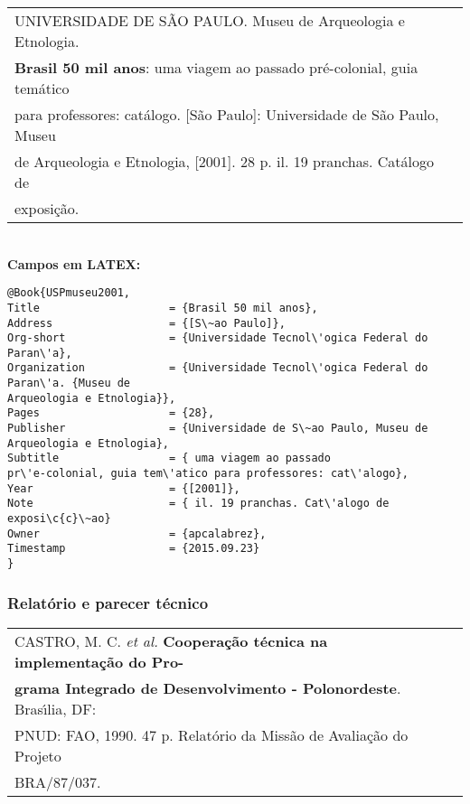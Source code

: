 \begin{tabular}{|l|c|} \hline
	UNIVERSIDADE DE S\~AO PAULO. Museu de Arqueologia e Etnologia.  \\ \textbf{Brasil 50 mil anos}: uma viagem ao passado pr\'e-colonial, guia tem\'atico \\ para professores: cat\'alogo. [S\~ao Paulo]: Universidade de S\~ao Paulo, Museu \\ de
	Arqueologia e Etnologia, [2001]. 28 p. il. 19 pranchas. Cat\'alogo de \\ exposi\c{c}\~ao.   \\\hline
\end{tabular}\\

\textbf{Campos em LATEX:}

\begin{verbatim}
@Book{USPmuseu2001,
Title                    = {Brasil 50 mil anos},
Address                  = {[S\~ao Paulo]},
Org-short                = {Universidade Tecnol\'ogica Federal do Paran\'a},
Organization             = {Universidade Tecnol\'ogica Federal do Paran\'a. {Museu de 
Arqueologia e Etnologia}},
Pages                    = {28},
Publisher                = {Universidade de S\~ao Paulo, Museu de 
Arqueologia e Etnologia},
Subtitle                 = { uma viagem ao passado
pr\'e-colonial, guia tem\'atico para professores: cat\'alogo},
Year                     = {[2001]},
Note                     = { il. 19 pranchas. Cat\'alogo de exposi\c{c}\~ao}
Owner                    = {apcalabrez},
Timestamp                = {2015.09.23}
}
\end{verbatim}

\subsubsection{Relat\'orio e parecer t\'ecnico}

\begin{tabular}{|l|c|} \hline
	CASTRO, M. C. \textit{et al.} \textbf{Coopera\c{c}\~ao t\'ecnica na implementa\c{c}\~ao do
		Pro-}\\\textbf{grama Integrado de Desenvolvimento - Polonordeste}. Bras\'{\i}lia, DF: \\ PNUD: FAO, 1990. 47 p. Relat\'orio da Miss\~ao de Avalia\c{c}\~ao do Projeto \\ BRA/87/037.     \\\hline
\end{tabular}\\


